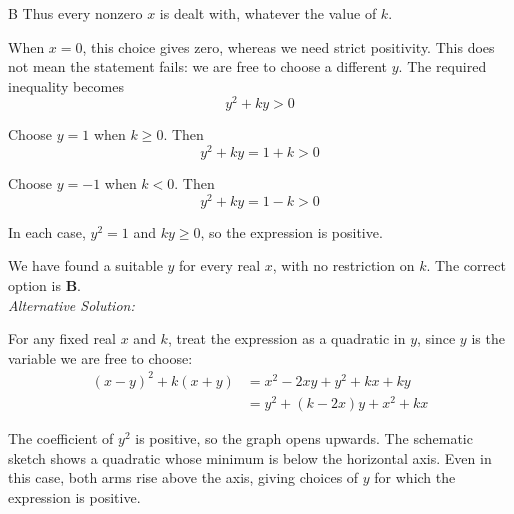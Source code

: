 \documentclass[11pt,a4paper]{article}
\begin{document}
\begin{enumerate}[label=\textbf{\arabic*.},leftmargin=*,itemsep=0pt,start=20]
\begin{djsSolution}{B}
Thus every nonzero $x$ is dealt with, whatever the value of $k$.

When $x=0$, this choice gives zero, whereas we need strict positivity. This does not mean the statement fails: we are free to choose a different $y$. The required inequality becomes
\[
y^2+ky>0
\]

Choose $y=1$ when $k\ge0$. Then
\[
y^2+ky=1+k>0
\]

Choose $y=-1$ when $k<0$. Then
\[
y^2+ky=1-k>0
\]

In each case, $y^2=1$ and $ky\ge0$, so the expression is positive.

We have found a suitable $y$ for every real $x$, with no restriction on $k$. The correct option is \textbf{B}.\\[5pt]

\textit{Alternative Solution:}

For any fixed real $x$ and $k$, treat the expression as a quadratic in $y$, since $y$ is the variable we are free to choose:
\[
\begin{aligned}
(x-y)^2+k(x+y)
&=x^2-2xy+y^2+kx+ky\\[5pt]
&=y^2+(k-2x)y+x^2+kx
\end{aligned}
\]

The coefficient of $y^2$ is positive, so the graph opens upwards. The schematic sketch shows a quadratic whose minimum is below the horizontal axis. Even in this case, both arms rise above the axis, giving choices of $y$ for which the expression is positive.

\begin{djsSolutionFigure}
\end{djsSolutionFigure}
\end{djsSolution}
\end{enumerate}
\end{document}
